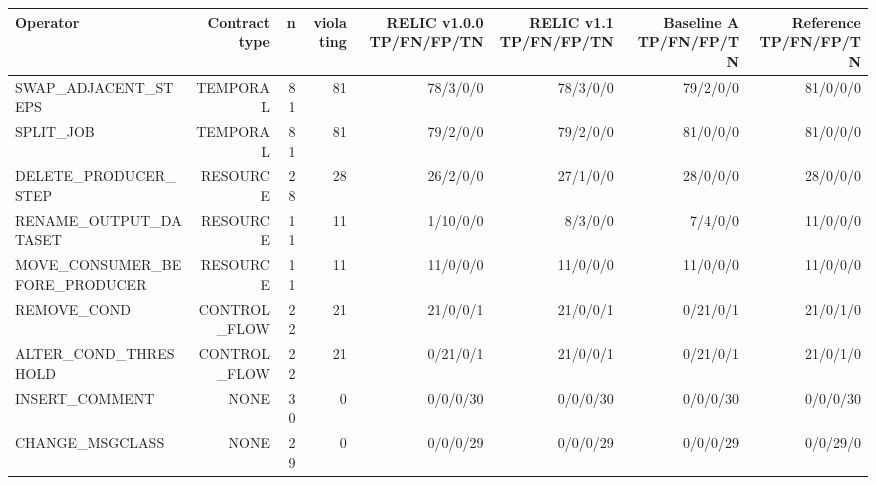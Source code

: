 \begin{tabular}{lrrrrrrr}
\toprule
Operator & Contract type & n & violating & RELIC v1.0.0 TP/FN/FP/TN & RELIC v1.1 TP/FN/FP/TN & Baseline A TP/FN/FP/TN & Reference TP/FN/FP/TN \\
\midrule
SWAP\_ADJACENT\_STEPS & TEMPORAL & 81 & 81 & 78/3/0/0 & 78/3/0/0 & 79/2/0/0 & 81/0/0/0 \\
SPLIT\_JOB & TEMPORAL & 81 & 81 & 79/2/0/0 & 79/2/0/0 & 81/0/0/0 & 81/0/0/0 \\
DELETE\_PRODUCER\_STEP & RESOURCE & 28 & 28 & 26/2/0/0 & 27/1/0/0 & 28/0/0/0 & 28/0/0/0 \\
RENAME\_OUTPUT\_DATASET & RESOURCE & 11 & 11 & 1/10/0/0 & 8/3/0/0 & 7/4/0/0 & 11/0/0/0 \\
MOVE\_CONSUMER\_BEFORE\_PRODUCER & RESOURCE & 11 & 11 & 11/0/0/0 & 11/0/0/0 & 11/0/0/0 & 11/0/0/0 \\
REMOVE\_COND & CONTROL\_FLOW & 22 & 21 & 21/0/0/1 & 21/0/0/1 & 0/21/0/1 & 21/0/1/0 \\
ALTER\_COND\_THRESHOLD & CONTROL\_FLOW & 22 & 21 & 0/21/0/1 & 21/0/0/1 & 0/21/0/1 & 21/0/1/0 \\
INSERT\_COMMENT & NONE & 30 & 0 & 0/0/0/30 & 0/0/0/30 & 0/0/0/30 & 0/0/0/30 \\
CHANGE\_MSGCLASS & NONE & 29 & 0 & 0/0/0/29 & 0/0/0/29 & 0/0/0/29 & 0/0/29/0 \\
\bottomrule
\end{tabular}
